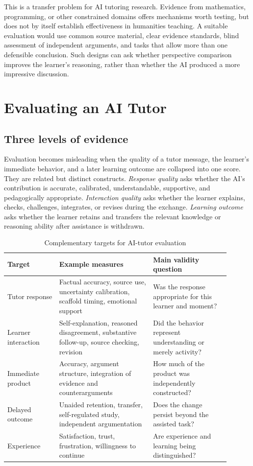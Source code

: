 \documentclass[11pt,a4paper]{article}
\begin{document}
This is a transfer problem for AI tutoring research. Evidence from mathematics, programming, or other constrained domains offers mechanisms worth testing, but does not by itself establish effectiveness in humanities teaching. A suitable evaluation would use common source material, clear evidence standards, blind assessment of independent arguments, and tasks that allow more than one defensible conclusion. Such designs can ask whether perspective comparison improves the learner's reasoning, rather than whether the AI produced a more impressive discussion.

\section{Evaluating an AI Tutor}
\subsection{Three levels of evidence}
Evaluation becomes misleading when the quality of a tutor message, the learner's immediate behavior, and a later learning outcome are collapsed into one score. They are related but distinct constructs. \emph{Response quality} asks whether the AI's contribution is accurate, calibrated, understandable, supportive, and pedagogically appropriate. \emph{Interaction quality} asks whether the learner explains, checks, challenges, integrates, or revises during the exchange. \emph{Learning outcome} asks whether the learner retains and transfers the relevant knowledge or reasoning ability after assistance is withdrawn.

\begin{table}[ht]
\centering
\small
\caption{Complementary targets for AI-tutor evaluation}
\begin{tabular}{p{0.21\linewidth}p{0.38\linewidth}p{0.31\linewidth}}
\toprule
Target & Example measures & Main validity question \\
\midrule
Tutor response & Factual accuracy, source use, uncertainty calibration, scaffold timing, emotional support & Was the response appropriate for this learner and moment? \\
Learner interaction & Self-explanation, reasoned disagreement, substantive follow-up, source checking, revision & Did the behavior represent understanding or merely activity? \\
Immediate product & Accuracy, argument structure, integration of evidence and counterarguments & How much of the product was independently constructed? \\
Delayed outcome & Unaided retention, transfer, self-regulated study, independent argumentation & Does the change persist beyond the assisted task? \\
Experience & Satisfaction, trust, frustration, willingness to continue & Are experience and learning being distinguished? \\
\bottomrule
\end{tabular}
\end{table}
\end{document}

